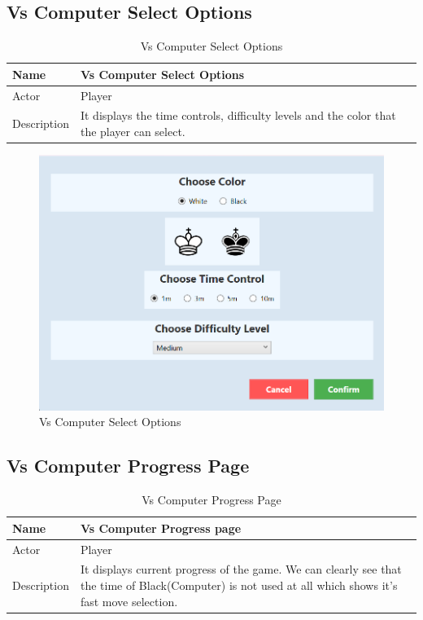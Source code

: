\documentclass[a4paper,12pt]{article}
\begin{document}
\subsection{Vs Computer Select Options}

\begin{longtable}{|m{}|m{}|}
    \caption{Vs Computer Select Options} \\
    \hline
    Name & Vs Computer Select Options \\
    \hline
    Actor & Player \\
    \hline
    Description & It displays the time controls, difficulty levels and the color that the player can select.  \\ 
    \hline
\end{longtable}

\begin{figure}[H]
    \centering
    \includegraphics[width=0.7\linewidth]{Images/Use Cases/vsComputerSelectOptions.png}
    \caption{Vs Computer Select Options}
    \label{fig:vsComputerSelectOptions}
\end{figure}
    
\subsection{Vs Computer Progress Page}

\begin{longtable}{|m{}|m{}|}
    \caption{Vs Computer Progress Page} \\
    \hline
    Name & Vs Computer Progress page \\
    \hline
    Actor & Player \\
    \hline
    Description & It displays current progress of the game. We can clearly see that the time of Black(Computer) is not used at all which shows it's fast move selection. \\ 
    \hline
\end{longtable}
\end{document}
